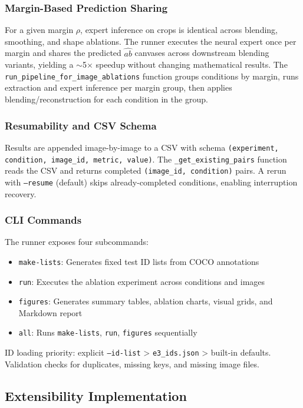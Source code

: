 \documentclass{FastFyp}
\begin{document}
\subsubsection{Margin-Based Prediction Sharing}
For a given margin $\rho$, expert inference on crops is identical across blending, smoothing, and shape ablations. The runner executes the neural expert once per margin and shares the predicted $\widehat{ab}$ canvases across downstream blending variants, yielding a $\sim$5$\times$ speedup without changing mathematical results. The \texttt{run\_pipeline\_for\_image\_ablations} function groups conditions by margin, runs extraction and expert inference per margin group, then applies blending/reconstruction for each condition in the group.

\subsubsection{Resumability and CSV Schema}
Results are appended image-by-image to a CSV with schema \texttt{(experiment, condition, image\_id, metric, value)}. The \texttt{\_get\_existing\_pairs} function reads the CSV and returns completed \texttt{(image\_id, condition)} pairs. A rerun with \texttt{--resume} (default) skips already-completed conditions, enabling interruption recovery.

\subsubsection{CLI Commands}
The runner exposes four subcommands:
\begin{itemize}
    \item \texttt{make-lists}: Generates fixed test ID lists from COCO annotations
    \item \texttt{run}: Executes the ablation experiment across conditions and images
    \item \texttt{figures}: Generates summary tables, ablation charts, visual grids, and Markdown report
    \item \texttt{all}: Runs \texttt{make-lists}, \texttt{run}, \texttt{figures} sequentially
\end{itemize}
ID loading priority: explicit \texttt{--id-list} > \texttt{e3\_ids.json} > built-in defaults. Validation checks for duplicates, missing keys, and missing image files.

\subsection{Extensibility Implementation}
\label{subsec:extensibility-impl}
\end{document}
